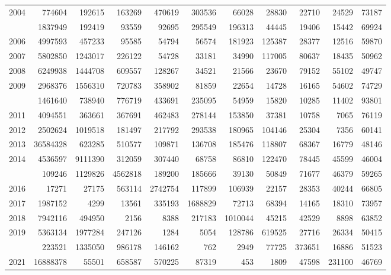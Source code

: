 \documentclass[
]{article}
\begin{document}
\begin{longtable}[t]{lrrrrrrrrrr}
2004 & 774604 & 192615 & 163269 & 470619 & 303536 & 66028 & 28830 & 22710 & 24529 & 73187\\
\addlinespace
2005 & 1837949 & 192419 & 93559 & 92695 & 295549 & 196313 & 44445 & 19406 & 15442 & 69924\\
2006 & 4997593 & 457233 & 95585 & 54794 & 56574 & 181923 & 125387 & 28377 & 12516 & 59870\\
2007 & 5802850 & 1243017 & 226122 & 54728 & 33181 & 34990 & 117005 & 80637 & 18435 & 50962\\
2008 & 6249938 & 1444708 & 609557 & 128267 & 34521 & 21566 & 23670 & 79152 & 55102 & 49747\\
2009 & 2968376 & 1556310 & 720783 & 358902 & 81859 & 22654 & 14728 & 16165 & 54602 & 74729\\
\addlinespace
2010 & 1461640 & 738940 & 776719 & 433691 & 235095 & 54959 & 15820 & 10285 & 11402 & 93801\\
2011 & 4094551 & 363661 & 367691 & 462483 & 278144 & 153850 & 37381 & 10758 & 7065 & 76119\\
2012 & 2502624 & 1019518 & 181497 & 217792 & 293538 & 180965 & 104146 & 25304 & 7356 & 60141\\
2013 & 36584328 & 623285 & 510577 & 109871 & 136708 & 185476 & 118807 & 68367 & 16779 & 48146\\
2014 & 4536597 & 9111390 & 312059 & 307440 & 68758 & 86810 & 122470 & 78445 & 45599 & 46004\\
\addlinespace
2015 & 109246 & 1129826 & 4562818 & 189200 & 185666 & 39130 & 50849 & 71677 & 46379 & 59265\\
2016 & 17271 & 27175 & 563114 & 2742754 & 117899 & 106939 & 22157 & 28353 & 40244 & 66805\\
2017 & 1987152 & 4299 & 13561 & 335193 & 1688829 & 72713 & 68394 & 14165 & 18310 & 73957\\
2018 & 7942116 & 494950 & 2156 & 8388 & 217183 & 1010044 & 45215 & 42529 & 8898 & 63852\\
2019 & 5363134 & 1977284 & 247126 & 1284 & 5054 & 128786 & 619525 & 27716 & 26334 & 50415\\
\addlinespace
2020 & 223521 & 1335050 & 986178 & 146162 & 762 & 2949 & 77725 & 373651 & 16886 & 51523\\
2021 & 16888378 & 55501 & 658587 & 570225 & 87319 & 453 & 1809 & 47598 & 231100 & 46769\\*
\end{longtable}
\end{document}

